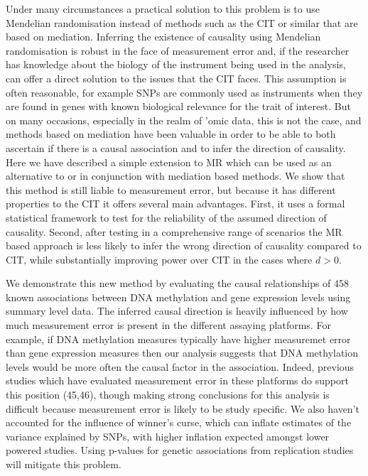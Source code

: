\documentclass[]{article}
\begin{document}
Under many circumstances a practical solution to this problem is to use
Mendelian randomisation instead of methods such as the CIT or similar
that are based on mediation. Inferring the existence of causality using
Mendelian randomisation is robust in the face of measurement error and,
if the researcher has knowledge about the biology of the instrument
being used in the analysis, can offer a direct solution to the issues
that the CIT faces. This assumption is often reasonable, for example
SNPs are commonly used as instruments when they are found in genes with
known biological relevance for the trait of interest. But on many
occasions, especially in the realm of 'omic data, this is not the case,
and methods based on mediation have been valuable in order to be able to
both ascertain if there is a causal association and to infer the
direction of causality. Here we have described a simple extension to MR
which can be used as an alternative to or in conjunction with mediation
based methods. We show that this method is still liable to measurement
error, but because it has different properties to the CIT it offers
several main advantages. First, it uses a formal statistical framework
to test for the reliability of the assumed direction of causality.
Second, after testing in a comprehensive range of scenarios the MR based
approach is less likely to infer the wrong direction of causality
compared to CIT, while substantially improving power over CIT in the
cases where \(d > 0\).

We demonstrate this new method by evaluating the causal relationships of
458 known associations between DNA methylation and gene expression
levels using summary level data. The inferred causal direction is
heavily influenced by how much measurement error is present in the
different assaying platforms. For example, if DNA methylation measures
typically have higher measuremet error than gene expression measures
then our analysis suggests that DNA methylation levels would be more
often the causal factor in the association. Indeed, previous studies
which have evaluated measurement error in these platforms do support
this position (45,46), though making strong conclusions for this
analysis is difficult because measurement error is likely to be study
specific. We also haven't accounted for the influence of winner's curse,
which can inflate estimates of the variance explained by SNPs, with
higher inflation expected amongst lower powered studies. Using p-values
for genetic associations from replication studies will mitigate this
problem.
\end{document}
